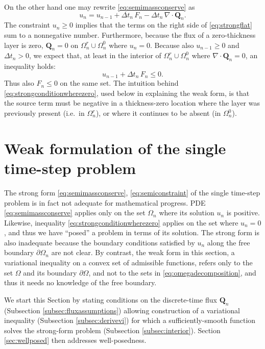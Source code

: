 \documentclass[final,onefignum]{siamart190516}
\newcommand\bQ{\mathbf{Q}}
\newcommand{\Div}{\nabla\cdot}
\begin{document}
On the other hand one may rewrite \eqref{eq:semimassconserve} as
\begin{equation}
u_n = u_{n-1} + \Delta t_n\, F_n - \Delta t_n\, \Div \bQ_n.  \label{eq:strongflat}
\end{equation}
The constraint $u_n \ge 0$ implies that the terms on the right side of \eqref{eq:strongflat} sum to a nonnegative number.  Furthermore, because the flux of a zero-thickness layer is zero, $\bQ_n=0$ on $\Omega_n^r \cup \Omega_n^0$ where $u_n=0$.  Because also $u_{n-1}\ge 0$ and $\Delta t_n > 0$, we expect that, at least in the interior of $\Omega_n^r \cup \Omega_n^0$ where $\Div \bQ_n=0$, an inequality holds:
\begin{equation}
u_{n-1} + \Delta t_n\, F_n \le 0. \label{eq:strongconditionwherezero}
\end{equation}
Thus also $F_n \le 0$ on the same set.  The intuition behind \eqref{eq:strongconditionwherezero}, used below in explaining the weak form, is that the source term must be negative in a thickness-zero location where the layer was previously present (i.e.~in $\Omega_n^r$), or where it continues to be absent (in $\Omega_n^0$).


\section{Weak formulation of the single time-step problem}  \label{sec:weakform}

The strong form \eqref{eq:semimassconserve}, \eqref{eq:semiconstraint} of the single time-step problem is in fact not adequate for mathematical progress.  PDE \eqref{eq:semimassconserve} applies only on the set $\Omega_n$ where its solution $u_n$ is positive.  Likewise, inequality \eqref{eq:strongconditionwherezero} applies on the set where $u_n=0$, and thus we have ``posed'' a problem in terms of its solution.  The strong form is also inadequate because the boundary conditions satisfied by $u_n$ along the free boundary $\partial\Omega_n$ are not clear.  By contrast, the weak form in this section, a variational inequality \cite{Friedman1982,KinderlehrerStampacchia1980} on a convex set of admissible functions, refers only to the set $\Omega$ and its boundary $\partial\Omega$, and not to the sets in \eqref{eq:omegadecomposition}, and thus it needs no knowledge of the free boundary.

We start this Section by stating conditions on the discrete-time flux $\bQ_n$ (Subsection \ref{subsec:fluxassumptions}) allowing construction of a variational inequality (Subsection \ref{subsec:derivevi}) for which a sufficiently-smooth function solves the strong-form problem (Subsection \ref{subsec:interior}).  Section \ref{sec:wellposed} then addresses well-posedness.
\end{document}
